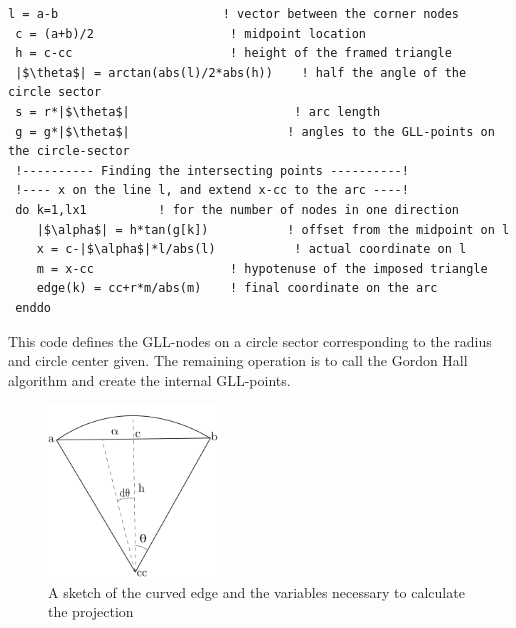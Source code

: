 \begingroup
\begin{lstlisting}[escapechar=|,frame=none]
 l = a-b                       ! vector between the corner nodes
 c = (a+b)/2                   ! midpoint location
 h = c-cc                      ! height of the framed triangle
 |$\theta$| = arctan(abs(l)/2*abs(h))    ! half the angle of the circle sector
 s = r*|$\theta$|                       ! arc length
 g = g*|$\theta$|                      ! angles to the GLL-points on the circle-sector
 !---------- Finding the intersecting points ----------!
 !---- x on the line l, and extend x-cc to the arc ----!
 do k=1,lx1          ! for the number of nodes in one direction
    |$\alpha$| = h*tan(g[k])           ! offset from the midpoint on l
    x = c-|$\alpha$|*l/abs(l)           ! actual coordinate on l
    m = x-cc                   ! hypotenuse of the imposed triangle
    edge(k) = cc+r*m/abs(m)    ! final coordinate on the arc
 enddo
\end{lstlisting}
\endgroup
This code defines the GLL-nodes on a circle sector corresponding to the radius and circle center given.
The remaining operation is to call the Gordon Hall algorithm and create the internal GLL-points.
%
\begin{figure}[h]
    \centering
    \includegraphics[width = 0.4\textwidth]{Figures/curvature.pdf}
    \caption{A sketch of the curved edge and the variables necessary to calculate the projection}
    \label{fig:curvature}
\end{figure}
%
